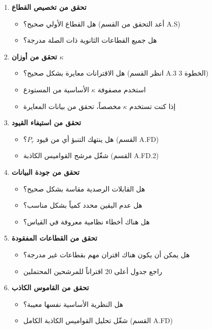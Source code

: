 \documentclass[13pt,a4paper]{article}
\begin{document}
	\begin{enumerate}
		\item \textbf{تحقق من تخصيص القطاع} 
		\begin{itemize}
			\item هل القطاع الأولي صحيح؟ (أعد التحقق من القسم A.S)
			\item هل جميع القطاعات الثانوية ذات الصلة مدرجة؟
		\end{itemize}
		
		\item \textbf{تحقق من أوزان $\kappa$}
		\begin{itemize}
			\item هل الاقترانات معايرة بشكل صحيح؟ (انظر القسم A.3 الخطوة 3)
			\item استخدم مصفوفة $\kappa$ الأساسية من المستودع
			\item إذا كنت تستخدم $\kappa$ مخصصاً، تحقق من بيانات المعايرة
		\end{itemize}
		
		\item \textbf{تحقق من استيفاء القيود}
		\begin{itemize}
			\item هل ينتهك التنبؤ أي من قيود $P_r$؟ (القسم A.FD)
			\item شغّل مرشح القواميس الكاذبة (القسم A.FD.2)
		\end{itemize}
		
		\item \textbf{تحقق من جودة البيانات}
		\begin{itemize}
			\item هل القابلات الرصدية مقاسة بشكل صحيح؟
			\item هل عدم اليقين محدد كمياً بشكل مناسب؟
			\item هل هناك أخطاء نظامية معروفة في القياس؟
		\end{itemize}
		
		\item \textbf{تحقق من القطاعات المفقودة}
		\begin{itemize}
			\item هل يمكن أن يكون هناك اقتران مهم بقطاعات غير مدرجة؟
			\item راجع جدول أعلى 20 اقتراناً للمرشحين المحتملين
		\end{itemize}
		
		\item \textbf{تحقق من القاموس الكاذب}
		\begin{itemize}
			\item هل النظرية الأساسية نفسها معيبة؟
			\item شغّل تحليل القواميس الكاذبة الكامل (القسم A.FD)
		\end{itemize}
		

\end{enumerate}
\end{document}
